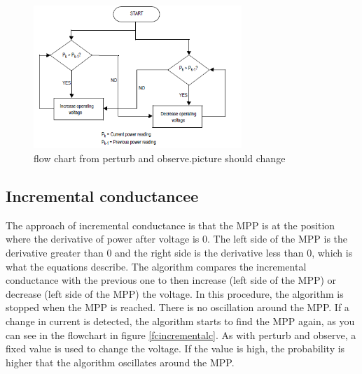 \begin{figure}[htbp]
	\begin{center}
		\includegraphics[width=0.7\textwidth]{../Pictures/flow_chart_perturb_observe}
		\caption{flow chart from perturb and observe.picture should change }
		\label{fcperturbandobserve}
	\end{center}	
\end{figure}

\subsection{Incremental conductancee}
The approach of incremental conductance is that the MPP is at the position where the derivative of power after voltage is 0. The left side of the MPP is the derivative greater than 0 and the right side is the derivative less than 0, which is what the equations describe. The algorithm compares the incremental conductance with the previous one to then increase (left side of the MPP) or decrease (left side of the MPP) the voltage.  In this procedure, the algorithm is stopped when the MPP is reached. There is no oscillation around the MPP. If a change in current is detected, the algorithm starts to find the MPP again, as you can see in the flowchart in figure \ref{fcincrementalc}. As with perturb and observe, a fixed value is used to change the voltage. If the value is high, the probability is higher that the algorithm oscillates around the MPP. 
